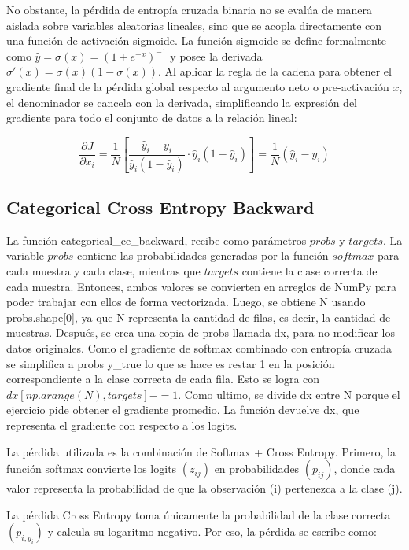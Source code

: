 \documentclass[12pt]{article}
\begin{document}
No obstante, la pérdida de entropía cruzada binaria no se evalúa de manera aislada sobre 
variables aleatorias lineales, sino que se acopla directamente con una función de activación 
sigmoide. La función sigmoide se define formalmente como $\hat{y} = \sigma(x) = (1 + e^{-x})^{-1}$ 
y posee la derivada $\sigma'(x) = \sigma(x)(1 - \sigma(x))$. Al aplicar la regla de la cadena 
para obtener el gradiente final de la pérdida global respecto al argumento neto o pre-activación
$x$, el denominador se cancela con la derivada, simplificando la expresión del gradiente para 
todo el conjunto de datos a la relación lineal:

\[
\frac{\partial J}{\partial x_i} = \frac{1}{N} \left[ \frac{\hat{y}_i - y_i}{\hat{y}_i(1 - \hat{y}_i)} \cdot \hat{y}_i(1 - \hat{y}_i) \right] = \frac{1}{N} (\hat{y}_i - y_i)
\]


\subsection{Categorical Cross Entropy Backward}
La función categorical\_ce\_backward, recibe como parámetros $probs$ y $targets$. La variable $probs$
 contiene las probabilidades generadas por la función $softmax$ para cada muestra y cada clase, mientras que $targets$ 
 contiene la clase correcta de cada muestra. 
Entonces, ambos valores se convierten en arreglos de NumPy para poder trabajar con ellos de forma vectorizada. 
Luego, se obtiene N usando probs.shape[0], ya que N representa la cantidad de filas, es decir, la cantidad de muestras. 
Después, se crea una copia de probs llamada dx, para no modificar los datos originales. Como el gradiente de softmax combinado 
con entropía cruzada se simplifica a probs y\_true lo que se hace es restar 1 en la posición correspondiente a la clase 
correcta de cada fila. Esto se logra con $dx[np.arange(N), targets] -= 1$. 
Como ultimo, se divide dx entre N porque el ejercicio pide obtener el gradiente promedio. La función devuelve dx, que 
representa el gradiente con respecto a los logits. 

La pérdida utilizada es la combinación de Softmax + Cross Entropy. Primero, la función softmax convierte los 
logits $(z_{ij})$ en probabilidades $(p_{ij})$, donde cada valor representa la probabilidad de que la observación (i) 
pertenezca a la clase (j).

La pérdida Cross Entropy toma únicamente la probabilidad de la clase correcta $(p_{i,y_i})$ y calcula su logaritmo 
negativo. Por eso, la pérdida se escribe como:
\end{document}
